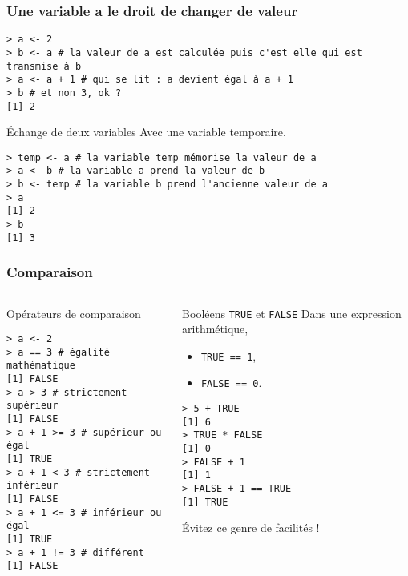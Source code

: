 \documentclass[10pt]{beamer}
\begin{document}
\begin{frame}[fragile]
  \frametitle{Une variable a le droit de changer de valeur}

  \begin{lstlisting}
> a <- 2
> b <- a # la valeur de a est calculée puis c'est elle qui est transmise à b
> a <- a + 1 # qui se lit : a devient égal à a + 1
> b # et non 3, ok ?
[1] 2
\end{lstlisting}


\begin{exampleblock}{Échange de deux variables}
  Avec une variable temporaire.
  \begin{lstlisting}[style=block]
> temp <- a # la variable temp mémorise la valeur de a
> a <- b # la variable a prend la valeur de b
> b <- temp # la variable b prend l'ancienne valeur de a
> a
[1] 2
> b
[1] 3
  \end{lstlisting}
\end{exampleblock}
\end{frame}

\begin{frame}[fragile]
  \frametitle{Comparaison}
 
\begin{columns}[t]
\begin{column}{0.59\textwidth}
  \begin{block}{Opérateurs de comparaison}
  \begin{lstlisting}[style=block]
> a <- 2 
> a == 3 # égalité mathématique
[1] FALSE
> a > 3 # strictement supérieur 
[1] FALSE
> a + 1 >= 3 # supérieur ou égal
[1] TRUE
> a + 1 < 3 # strictement inférieur
[1] FALSE
> a + 1 <= 3 # inférieur ou égal
[1] TRUE
> a + 1 != 3 # différent
[1] FALSE
  \end{lstlisting}
\end{block}
\end{column}
\begin{column}{0.39\textwidth}
  \begin{block}{Booléens \texttt{TRUE} et \texttt{FALSE}}
    Dans une expression arithmétique,
    \begin{itemize}
    \item \texttt{TRUE == 1},
    \item \texttt{FALSE == 0}.
    \end{itemize}
  \begin{lstlisting}
> 5 + TRUE
[1] 6
> TRUE * FALSE
[1] 0
> FALSE + 1
[1] 1
> FALSE + 1 == TRUE
[1] TRUE
\end{lstlisting}
\alert{Évitez ce genre de facilités !}    
  \end{block}
\end{column}
\end{columns}
\end{frame}
\end{document}
